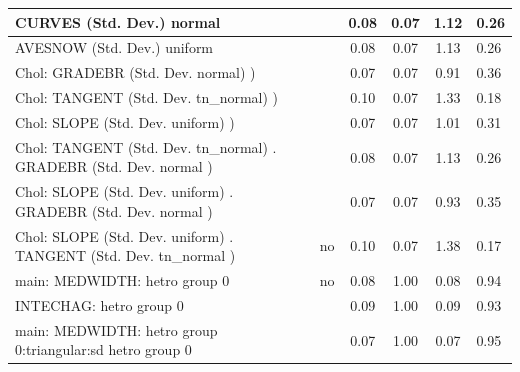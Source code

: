 \begin{table}
\begin{center}
\begin{tabular}{|l|l|c|c|c|l|}
			\hline
			CURVES (Std. Dev.) normal &  & 0.08 & 0.07 & 1.12 & 0.26 \\
			\hline
			AVESNOW (Std. Dev.) uniform &  & 0.08 & 0.07 & 1.13 & 0.26 \\
			\hline
			 Chol: GRADEBR (Std. Dev. normal) ) &  & 0.07 & 0.07 & 0.91 & 0.36 \\
			\hline
			 Chol: TANGENT (Std. Dev. tn_normal) ) &  & 0.10 & 0.07 & 1.33 & 0.18 \\
			\hline
			 Chol: SLOPE (Std. Dev. uniform) ) &  & 0.07 & 0.07 & 1.01 & 0.31 \\
			\hline
			 Chol: TANGENT (Std. Dev. tn_normal) . GRADEBR (Std. Dev.   normal ) &  & 0.08 & 0.07 & 1.13 & 0.26 \\
			\hline
			 Chol: SLOPE (Std. Dev. uniform) . GRADEBR (Std. Dev.   normal ) &  & 0.07 & 0.07 & 0.93 & 0.35 \\
			\hline
			 Chol: SLOPE (Std. Dev. uniform) . TANGENT (Std. Dev.   tn_normal ) & no & 0.10 & 0.07 & 1.38 & 0.17 \\
			\hline
			main: MEDWIDTH: hetro group 0 & no & 0.08 & 1.00 & 0.08 & 0.94 \\
			\hline
			INTECHAG: hetro group 0 &  & 0.09 & 1.00 & 0.09 & 0.93 \\
			\hline
			main: MEDWIDTH: hetro group 0:triangular:sd  hetro group 0 &  & 0.07 & 1.00 & 0.07 & 0.95 \\
			\hline
		\end{tabular}
	\end{center}
\end{table}